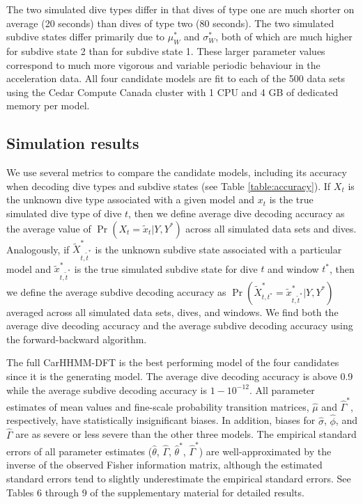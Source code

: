The two simulated dive types differ in that dives of type one are much shorter on average (20 seconds) than dives of type two (80 seconds). The two simulated subdive states differ primarily due to $\mu_W^*$ and $\sigma_W^*$, both of which are much higher for subdive state 2 than for subdive state 1. These larger parameter values correspond to much more vigorous and variable periodic behaviour in the acceleration data. All four candidate models are fit to each of the 500 data sets using the Cedar Compute Canada cluster with 1 CPU and 4 GB of dedicated memory per model.

\subsection{Simulation results}

We use several metrics to compare the candidate models, including its accuracy when decoding dive types and subdive states (see Table \ref{table:accuracy}). If $X_t$ is the unknown dive type associated with a given model and $x_t$ is the true simulated dive type of dive $t$, then we define average dive decoding accuracy as the average value of $\Pr(X_{t} = \tilde x_{t}|Y,Y^*)$ across all simulated data sets and dives. Analogously, if $\tilde X^*_{t,\tilde t^*}$ is the unknown subdive state associated with a particular model and $\tilde x^*_{t,\tilde t^*}$ is the true simulated subdive state for dive $t$ and window $t^*$, then we define the average subdive decoding accuracy as $\Pr(\tilde X^*_{t,t^*} = \tilde x^*_{t,\tilde t^*}|Y,Y^*)$ averaged across all simulated data sets, dives, and windows. We find both the average dive decoding accuracy and the average subdive decoding accuracy using the forward-backward algorithm.

The full CarHHMM-DFT is the best performing model of the four candidates since it is the generating model. The average dive decoding accuracy is above 0.9 while the average subdive decoding accuracy is $1-10^{-12}$. All parameter estimates of mean values and fine-scale probability transition matrices, $\hat \mu$ and $\hat \Gamma^*$, respectively, have statistically insignificant biases. In addition, biases for $\hat \sigma$, $\hat \phi$, and $\hat \Gamma$ are as severe or less severe than the other three models. The empirical standard errors of all parameter estimates ($\hat \theta$, $\hat \Gamma$, $\hat \theta^*$, $\hat \Gamma^*$) are well-approximated by the inverse of the observed Fisher information matrix, although the estimated standard errors tend to slightly underestimate the empirical standard errors. See Tables 6 through 9 of the supplementary material for detailed results.

